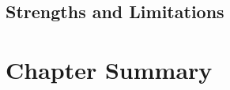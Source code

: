 \subsection{Strengths and Limitations}
\mbox{}\par

\section{Chapter Summary}
\label{sec:study1-summary}
\mbox{}\par

%
% 
%
%
